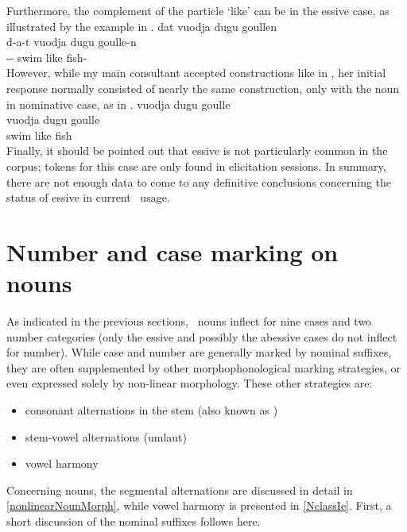Furthermore, the complement of the particle  ‘like’ can be in the essive case, as illustrated by the example in . 
\ea\label{ess3}
\glll	dat vuodja dugu {goullen}\\
	d-a-t vuodja dugu goulle-n\\
	-- swim\BS{} like fish-\\\nopagebreak
{} 
\z
However, while my main consultant accepted constructions like in , her initial response normally consisted of nearly the same construction, only with the noun in nominative case, as in . 
\ea\label{ess4}
\glll	vuodja dugu {goulle}\\
	vuodja dugu goulle\\
	swim\BS{} like fish\BS{}\\\nopagebreak
{} 
\z
Finally, it should be pointed out that essive is not particularly common in the corpus; tokens for this case are only found in elicitation sessions. In summary, there are not enough data to come to any definitive conclusions concerning the status of essive in current \PS\ usage. 

\section{Number and case marking on nouns}\label{NumCaseNouns}
As indicated in the previous sections, \PS\ nouns inflect for nine cases and two number categories (only the essive and possibly the abessive cases do not inflect for number). While case and number are generally marked by nominal suffixes, they are often supplemented by other morphophonological marking strategies, or even expressed solely by non-linear morphology. These other strategies are: 
\begin{itemize}
\item{consonant alternations in the stem (also known as )}
\item{stem-vowel alternations (umlaut)}
\item{vowel harmony}
\end{itemize} %
Concerning nouns, the segmental alternations are discussed in detail in \SEC\ref{nonlinearNounMorph}, while vowel harmony is presented in \SEC\ref{NclassIe}. First, a short discussion of the nominal suffixes follows here.


